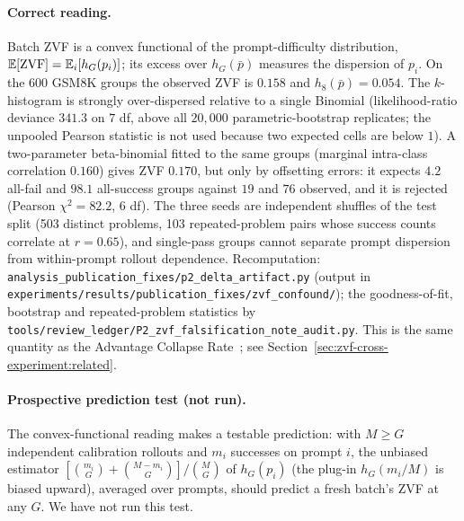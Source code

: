 \paragraph{Correct reading.} Batch ZVF is a convex functional of the
prompt-difficulty distribution, $\mathbb{E}[\mathrm{ZVF}]=\mathbb{E}_i[h_G(p_i)]$; its excess
over $h_G(\bar p)$ measures the dispersion of $p_i$. On the 600 GSM8K groups
the observed ZVF is $0.158$ and $h_8(\bar p)=0.054$. The $k$-histogram is
strongly over-dispersed relative to a single Binomial (likelihood-ratio deviance
$341.3$ on $7$ df, above all $20{,}000$ parametric-bootstrap replicates; the
unpooled Pearson statistic is not used because two expected cells are below $1$).
A two-parameter beta-binomial fitted to the same groups (marginal intra-class
correlation $0.160$) gives ZVF $0.170$, but only by offsetting errors: it expects
$4.2$ all-fail and $98.1$ all-success groups against $19$ and $76$ observed, and
it is rejected (Pearson $\chi^2=82.2$, $6$ df). The three seeds are independent
shuffles of the test split (503 distinct problems, 103 repeated-problem pairs
whose success counts correlate at $r=0.65$), and single-pass groups cannot
separate prompt dispersion from within-prompt rollout dependence. Recomputation:
\texttt{analysis\_publication\_fixes/p2\_delta\_artifact.py} (output in
\texttt{experiments/results/publication\_fixes/zvf\_confound/}); the goodness-of-fit,
bootstrap and repeated-problem statistics by
\texttt{tools/review\_ledger/P2\_zvf\_falsification\_note\_audit.py}. This is the
same quantity as the Advantage Collapse Rate~\cite{he2026advantage}; see
Section~\ref{sec:zvf-cross-experiment:related}.

\paragraph{Prospective prediction test (not run).} The convex-functional
reading makes a testable prediction: with $M\ge G$ independent calibration
rollouts and $m_i$ successes on prompt $i$, the unbiased estimator
$[\binom{m_i}{G}+\binom{M-m_i}{G}]/\binom{M}{G}$ of $h_G(p_i)$ (the plug-in
$h_G(m_i/M)$ is biased upward), averaged over prompts, should predict a fresh
batch's ZVF at any $G$. We have not run this test.

